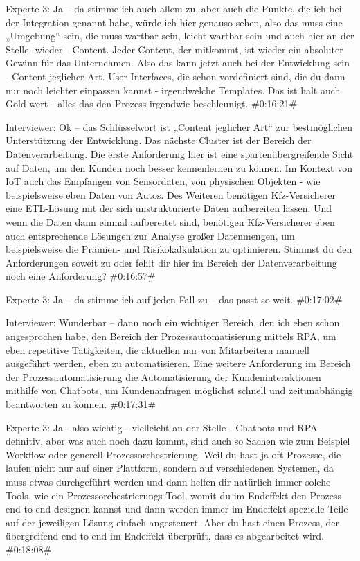 Experte 3:
Ja – da stimme ich auch allem zu, aber auch die Punkte, die ich bei der Integration genannt habe, würde ich hier genauso sehen, also das muss eine „Umgebung“ sein, die muss wartbar sein, leicht wartbar sein und auch hier an der Stelle -wieder - Content. Jeder Content, der mitkommt, ist wieder ein absoluter Gewinn für das Unternehmen. Also das kann jetzt auch bei der Entwicklung sein - Content jeglicher Art. User Interfaces, die schon vordefiniert sind, die du dann nur noch leichter einpassen kannst - irgendwelche Templates. Das ist halt auch Gold wert - alles das den Prozess irgendwie beschleunigt.
\#0:16:21\#

Interviewer:
Ok – das Schlüsselwort ist „Content jeglicher Art“ zur bestmöglichen Unterstützung der Entwicklung. Das nächste Cluster ist der Bereich der Datenverarbeitung. Die erste Anforderung hier ist eine spartenübergreifende Sicht auf Daten, um den Kunden noch besser kennenlernen zu können. Im Kontext von IoT auch das Empfangen von Sensordaten, von physischen Objekten - wie beispielsweise eben Daten von Autos. Des Weiteren benötigen Kfz-Versicherer eine ETL-Lösung mit der sich unstrukturierte Daten aufbereiten lassen. Und wenn die Daten dann einmal aufbereitet sind, benötigen Kfz-Versicherer eben auch entsprechende Lösungen zur Analyse großer Datenmengen, um beispielsweise die Prämien- und Risikokalkulation zu optimieren. Stimmst du den Anforderungen soweit zu oder fehlt dir hier im Bereich der Datenverarbeitung noch eine Anforderung?
\#0:16:57\#

Experte 3:
Ja – da stimme ich auf jeden Fall zu – das passt so weit.
\#0:17:02\#

Interviewer:
Wunderbar – dann noch ein wichtiger Bereich, den ich eben schon angesprochen habe, den Bereich der Prozessautomatisierung mittels RPA, um eben repetitive Tätigkeiten, die aktuellen nur von Mitarbeitern manuell ausgeführt werden, eben zu automatisieren. Eine weitere Anforderung im Bereich der Prozessautomatisierung die Automatisierung der Kundeninteraktionen mithilfe von Chatbots, um Kundenanfragen möglichst schnell und zeitunabhängig beantworten zu können.
\#0:17:31\#

Experte 3:
Ja - also wichtig - vielleicht an der Stelle - Chatbots und RPA definitiv, aber was auch noch dazu kommt, sind auch so Sachen wie zum Beispiel Workflow oder generell Prozessorchestrierung. Weil du hast ja oft Prozesse, die laufen nicht nur auf einer Plattform, sondern auf verschiedenen Systemen, da muss etwas durchgeführt werden und dann helfen dir natürlich immer solche Tools, wie ein Prozessorchestrierungs-Tool, womit du im Endeffekt den Prozess end-to-end designen kannst und dann werden immer im Endeffekt spezielle Teile auf der jeweiligen Lösung einfach angesteuert. Aber du hast einen Prozess, der übergreifend end-to-end im Endeffekt überprüft, dass es abgearbeitet wird. 
\#0:18:08\#

